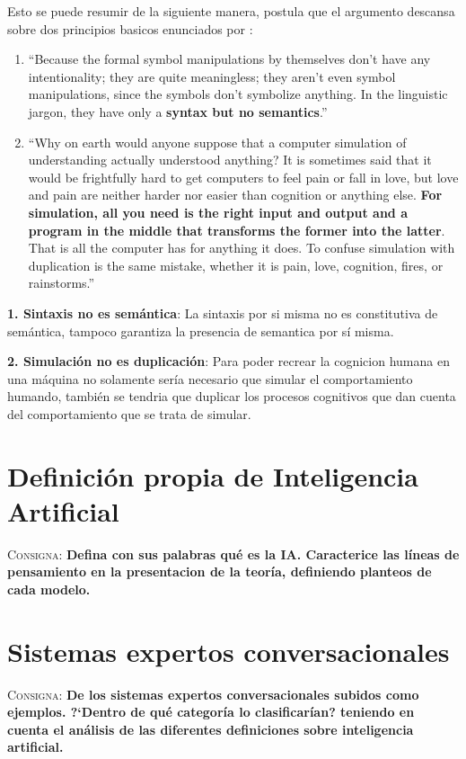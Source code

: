 \documentclass{article}
\begin{document}
Esto se puede resumir de la siguiente manera, \cite{searle2009} postula que el argumento descansa sobre dos principios basicos enunciados por \cite{searle1980}:
\begin{enumerate}
\item ``Because the formal symbol manipulations by themselves don't have any intentionality; they are quite meaningless; they aren't even symbol manipulations, since the symbols don't symbolize anything. In the linguistic jargon, they have only a \textbf{syntax but no semantics}.''
\item ``Why on earth would anyone suppose that a computer simulation of understanding actually understood anything? It is sometimes said that it would be frightfully hard to get computers to feel pain or fall in love, but love and pain are neither harder nor easier than cognition or anything else. \textbf{For simulation, all you need is the right input and output and a program in the middle that transforms the former into the latter}. That is all the computer has for anything it does. To confuse simulation with duplication is the same mistake, whether it is pain, love, cognition, fires, or rainstorms.''
\end{enumerate}

\textbf{1. Sintaxis no es sem\'antica}: La sintaxis por si misma no es constitutiva de sem\'antica, tampoco garantiza la presencia de semantica por s\'i misma.

\textbf{2. Simulaci\'on no es duplicaci\'on}: Para poder recrear la cognicion humana en una m\'aquina no solamente ser\'ia necesario que simular el comportamiento humando, tambi\'en se tendria que duplicar los procesos cognitivos que dan cuenta del comportamiento que se trata de simular.


\section{Definici\'on propia de Inteligencia Artificial}
\textsc{Consigna}: \textbf{Defina con sus palabras qu\'e es la IA. Caracterice las l\'ineas de pensamiento en la presentacion de la teor\'ia, definiendo planteos de cada modelo.}

\section{Sistemas expertos conversacionales}
\textsc{Consigna}: \textbf{De los sistemas expertos conversacionales subidos como ejemplos. ?`Dentro de qu\'e categor\'ia lo clasificar\'ian? teniendo en cuenta el an\'alisis de las diferentes definiciones sobre inteligencia artificial.}
\end{document}
